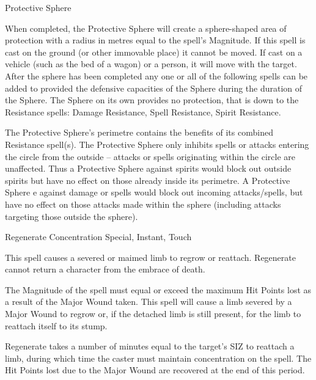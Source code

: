 \begin{samepage}
\begin{rpg-spell}
{Protective Sphere}
{}

When completed, the Protective Sphere will create a sphere-shaped area of protection with a radius in metres equal to the spell’s Magnitude. If this spell is cast on the ground (or other immovable place) it cannot be moved. If cast on a vehicle (such as the bed of a wagon) or a person, it will move with the target.  After the sphere has been completed any one or all of the following spells can be added to provided the defensive capacities of the Sphere during the duration of the Sphere. The Sphere on its own provides no protection, that is down to the Resistance spells: Damage Resistance, Spell Resistance, Spirit Resistance.

The Protective Sphere’s perimetre contains the benefits of its combined Resistance spell(s). The Protective Sphere only inhibits spells or attacks entering the circle from the outside – attacks or spells originating within the circle are unaffected. Thus a Protective Sphere against spirits would block out outside spirits but have no effect on those already inside its perimetre. A Protective Sphere e against damage or spells would block out incoming attacks/spells, but have no effect on those attacks made within the sphere (including attacks targeting those outside the sphere). 
\end{rpg-spell}
\end{samepage}


\begin{samepage}
\begin{rpg-spell}
{Regenerate}
{Concentration Special, Instant, Touch}

This spell causes a severed or maimed limb to regrow or reattach. Regenerate cannot return a character from the embrace of death. 

The Magnitude of the spell must equal or exceed the maximum Hit Points lost as a result of the Major Wound taken. This spell will cause a limb severed by a Major Wound to regrow or, if the detached limb is still present, for the limb to reattach itself to its stump. 

Regenerate takes a number of minutes equal to the target’s SIZ to reattach a limb, during which time the caster must maintain concentration on the spell. The Hit Points lost due to the Major Wound are recovered at the end of this period.
\end{rpg-spell}
\end{samepage}


